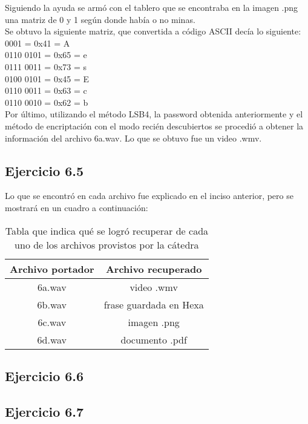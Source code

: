 \documentclass{article}
\begin{document}
\noindent Siguiendo la ayuda se armó con el tablero que se encontraba en la imagen .png una matriz de 0 y 1 según donde había o no minas.\\
Se obtuvo la siguiente matriz, que convertida a código ASCII decía lo siguiente:\\

 0001 = 0x41 = A \\
0110 0101 = 0x65 = e \\
0111 0011 = 0x73 = s \\
0100 0101 = 0x45 = E \\
0110 0011 = 0x63 = c \\
0110 0010 = 0x62 = b \\

\noindent Por último, utilizando el método LSB4, la password obtenida anteriormente y el método de encriptación con el modo recién descubiertos se procedió a obtener la información del archivo 6a.wav. Lo que se obtuvo fue un video .wmv.

\subsection{Ejercicio 6.5}

Lo que se encontró en cada archivo fue explicado en el inciso anterior, pero se mostrará en un cuadro a continuación:

\begin{table}[H]
\begin{center}
\begin{tabular}{|c|c|}
\hline
Archivo portador & Archivo recuperado \\
\hline
\hline
6a.wav & video .wmv \\
\hline
6b.wav & frase guardada en Hexa\\
\hline
6c.wav & imagen .png \\
\hline  
6d.wav & documento .pdf \\
\hline  
\end{tabular}
\end{center}
\caption{Tabla que indica qué se logró recuperar de cada uno de los archivos provistos por la cátedra}
\label{found}
\end{table}

\subsection{Ejercicio 6.6}

\subsection{Ejercicio 6.7}
\end{document}
